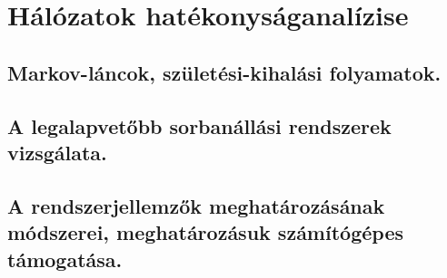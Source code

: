 \section{Hálózatok hatékonyságanalízise}
\subsection{Markov-láncok, születési-kihalási folyamatok.}

\subsection{A legalapvetőbb sorbanállási rendszerek vizsgálata.}

\subsection{A rendszerjellemzők meghatározásának módszerei, meghatározásuk számítógépes támogatása.}
